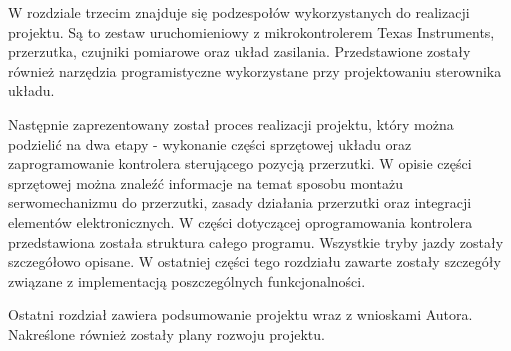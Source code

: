 W rozdziale trzecim znajduje się podzespołów wykorzystanych do realizacji projektu. Są to zestaw uruchomieniowy z mikrokontrolerem Texas Instruments, przerzutka, czujniki pomiarowe oraz układ zasilania. Przedstawione zostały również narzędzia programistyczne wykorzystane przy projektowaniu sterownika układu. 

Następnie zaprezentowany został proces realizacji projektu, który można podzielić na dwa etapy - wykonanie części sprzętowej układu oraz zaprogramowanie kontrolera sterującego pozycją przerzutki. W opisie części sprzętowej można znaleźć informacje na temat sposobu montażu serwomechanizmu do przerzutki, zasady działania przerzutki oraz integracji elementów elektronicznych. W części dotyczącej oprogramowania kontrolera przedstawiona została struktura całego programu. Wszystkie tryby jazdy zostały szczegółowo opisane. W ostatniej części tego rozdziału zawarte zostały szczegóły związane z implementacją poszczególnych funkcjonalności.

Ostatni rozdział zawiera podsumowanie projektu wraz z wnioskami Autora. Nakreślone również zostały plany rozwoju projektu.